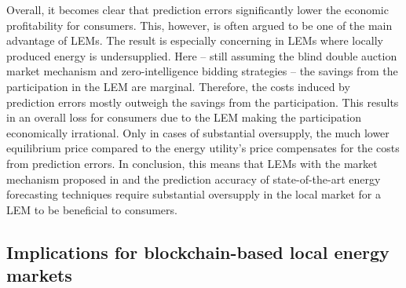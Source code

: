 Overall, it becomes clear that prediction errors significantly lower the economic profitability for consumers. This, however, is often argued to be one of the main advantage of LEMs. The result is especially concerning in LEMs where locally produced energy is undersupplied. Here -- still assuming the blind double auction market mechanism and zero-intelligence bidding strategies -- the savings from the participation in the LEM are marginal. Therefore, the costs induced by prediction errors mostly outweigh the savings from the participation. This results in an overall loss for consumers due to the LEM making the participation economically irrational. Only in cases of substantial oversupply, the much lower equilibrium price compared to the energy utility's price compensates for the costs from prediction errors. In conclusion, this means that LEMs with the market mechanism proposed in \citet{Mengelkamp:2018a} and the prediction accuracy of state-of-the-art energy forecasting techniques require substantial oversupply in the local market for a LEM to be beneficial to consumers.




\subsection{Implications for blockchain-based local energy markets}\label{Sec:Results;Subsec:Implications}








